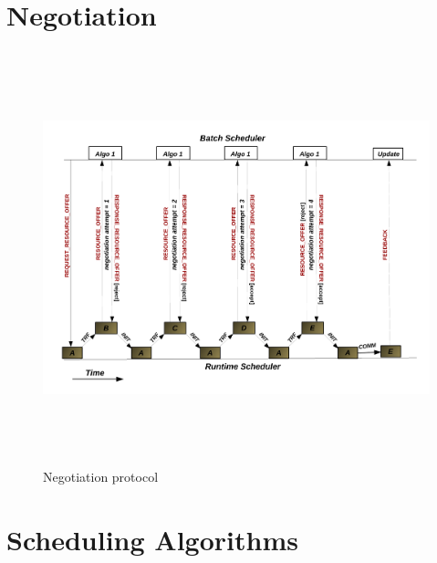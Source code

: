 \section{Negotiation}
\begin{figure}[!htbp]
\hspace*{-0.5in}
\includegraphics[width=1.2\textwidth, height=120mm]{./figures/negotiation.pdf}
\caption{Negotiation protocol}
\label{fig:1}
\end{figure}
\section{Scheduling Algorithms}
